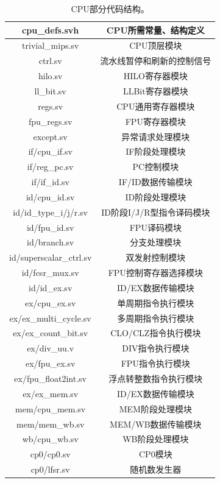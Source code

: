 \begin{table}
	\centering
	\begin{tabular}{|c|c|} \hline
		cpu\_defs.svh & CPU所需常量、结构定义 \\ \hline
		trivial\_mips.sv & CPU顶层模块 \\ \hline
		ctrl.sv & 流水线暂停和刷新的控制信号 \\ \hline
		hilo.sv & HILO寄存器模块 \\ \hline
		ll\_bit.sv & LLBit寄存器模块 \\ \hline
		regs.sv & CPU通用寄存器模块 \\ \hline
		fpu\_regs.sv & FPU寄存器模块 \\ \hline
		except.sv & 异常请求处理模块 \\ \hline \hline
		if/cpu\_if.sv & IF阶段处理模块 \\ \hline
		if/reg\_pc.sv & PC控制模块  \\ \hline
		if/if\_id.sv & IF/ID数据传输模块 \\ \hline \hline
		id/cpu\_id.sv & ID阶段处理模块 \\ \hline
		id/id\_type\_i/j/r.sv & ID阶段I/J/R型指令译码模块 \\ \hline
		id/fpu\_id.sv & FPU译码模块 \\ \hline
		id/branch.sv & 分支处理模块 \\ \hline
		id/superscalar\_ctrl.sv & 双发射控制模块 \\ \hline
		id/fcsr\_mux.sv & FPU控制寄存器选择模块 \\ \hline
		id/id\_ex.sv & ID/EX数据传输模块 \\ \hline \hline
		ex/cpu\_ex.sv & 单周期指令执行模块 \\ \hline
		ex/ex\_multi\_cycle.sv & 多周期指令执行模块 \\ \hline
		ex/ex\_count\_bit.sv & CLO/CLZ指令执行模块 \\ \hline
		ex/div\_uu.v & DIV指令执行模块 \\ \hline
		ex/fpu\_ex.sv & FPU指令执行模块 \\ \hline
		ex/fpu\_float2int.sv & 浮点转整数指令执行模块 \\ \hline
		ex/ex\_mem.sv & ID/EX数据传输模块 \\ \hline \hline
		mem/cpu\_mem.sv & MEM阶段处理模块 \\ \hline
		mem/mem\_wb.sv & MEM/WB数据传输模块 \\ \hline \hline
		wb/cpu\_wb.sv & WB阶段处理模块 \\ \hline \hline
		cp0/cp0.sv & CP0模块 \\ \hline
		cp0/lfsr.sv & 随机数发生器 \\ \hline
	\end{tabular}
	\caption{CPU部分代码结构。}
	\label{tab:cpu-code-structure}
\end{table}
